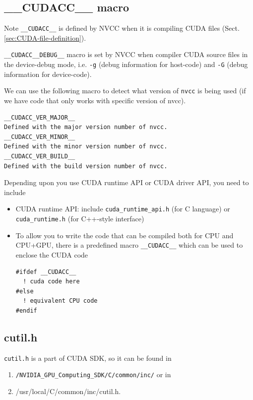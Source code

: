 \subsection{\_\_CUDACC\_\_ macro}
\label{sec:coding-tips}
\label{sec:__CUDACC__-macro}

Note \verb!__CUDACC__! is defined by NVCC when it is compiling CUDA files
(Sect.\ref{sec:CUDA-file-definition}).

\verb!__CUDACC__DEBUG__! macro is set by NVCC when compiler CUDA source files in
the device-debug mode, i.e.
\verb!-g! (debug information for host-code) and \verb!-G! (debug information for
device-code).

We can use the following macro to detect what version of \verb!nvcc! is being
used (if we have code that only works with specific version of nvcc).
\begin{verbatim}
__CUDACC_VER_MAJOR__
Defined with the major version number of nvcc.
__CUDACC_VER_MINOR__
Defined with the minor version number of nvcc.
__CUDACC_VER_BUILD__
Defined with the build version number of nvcc.
\end{verbatim}


Depending upon you use CUDA runtime API or CUDA driver API, you need to include
\begin{itemize}
  \item CUDA runtime API: include \verb!cuda_runtime_api.h! (for C language) or
  \verb!cuda_runtime.h! (for C++-style interface)

  \item  To allow you to write the code that can be compiled both for CPU and
CPU+GPU, there is a predefined macro \verb!__CUDACC__! which can be
used to enclose the CUDA code 
\begin{lstlisting}
#ifdef __CUDACC__
  ! cuda code here
#else
  ! equivalent CPU code
#endif
\end{lstlisting}
\end{itemize}

\subsection{cutil.h}
\label{sec:cutil.h}

\verb!cutil.h! is a part of CUDA SDK, so it can be found in
\begin{enumerate}
\item \verb!/NVIDIA_GPU_Computing_SDK/C/common/inc/! or in
\item /usr/local/C/common/inc/cutil.h. 
\end{enumerate}

